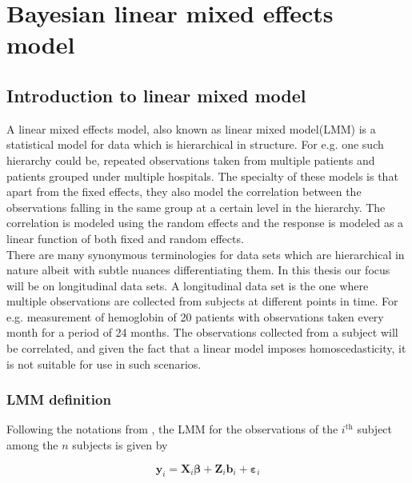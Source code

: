 
\chapter{Bayesian linear mixed effects model}
\label{ch : blmm}

\section{Introduction to linear mixed model}
\label{sec : lmm}
A linear mixed effects model, also known as linear mixed model(LMM) is a statistical model for data which is hierarchical in structure. For e.g. one such hierarchy could be, repeated observations taken from multiple patients and patients grouped under multiple hospitals. The specialty of these models is that apart from the fixed effects, they also model the correlation between the observations falling in the same group at a certain level in the hierarchy. The correlation is modeled using the random effects and the response is modeled as a linear function of both fixed and random effects.\\

There are many synonymous terminologies for data sets which are hierarchical in nature albeit with subtle nuances differentiating them. In this thesis our focus will be on longitudinal data sets. A longitudinal data set is the one where multiple observations are collected from subjects at different points in time. For e.g. measurement of hemoglobin of 20 patients with observations taken every month for a period of 24 months. The observations collected from a subject will be correlated, and given the fact that a linear model imposes homoscedasticity, it is not suitable for use in such scenarios.

\subsection{LMM definition}
\label{subsec : lmm_definition}
Following the notations from \citet{lesaffre_bayesian_2012}, the LMM for the observations of the $i^\text{th}$ subject among the $n$ subjects is given by

\begin{equation}
\label{eq : lmm_definition}
\boldsymbol{y}_i = \boldsymbol{X}_{i}\boldsymbol{\beta} + \boldsymbol{Z}_{i}\boldsymbol{b}_{i} + \boldsymbol{\varepsilon}_{i}
\end{equation}

